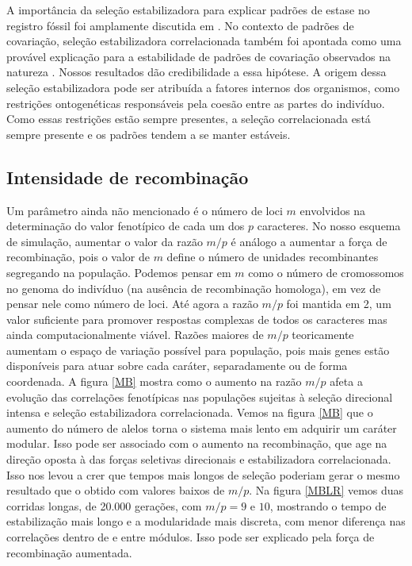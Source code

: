 A importância da seleção estabilizadora para explicar padrões de estase
no registro fóssil foi amplamente discutida em \cite{Charlesworth1982a}.
No contexto de padrões de covariação, seleção estabilizadora
correlacionada também foi apontada como uma provável explicação para a
estabilidade de padrões de covariação observados na natureza
\citep{Cheverud1984, Marroig2001, Porto2009}.
Nossos resultados dão credibilidade a essa hipótese.
A origem dessa seleção estabilizadora pode ser atribuída a fatores
internos dos organismos, como restrições ontogenéticas responsáveis pela
coesão entre as partes do indivíduo.
Como essas restrições estão sempre presentes, a seleção correlacionada
está sempre presente e os padrões tendem a se manter estáveis.

\subsection{Intensidade de recombinação}

Um parâmetro ainda não mencionado é o número de loci $m$ envolvidos na
determinação do valor fenotípico de cada um dos $p$ caracteres.
No nosso esquema de simulação, aumentar o valor da razão $m/p$ é análogo
a aumentar a força de recombinação, pois o valor de $m$ define o número
de unidades recombinantes segregando na população.
Podemos pensar em $m$ como o número de cromossomos no genoma do
indivíduo (na ausência de recombinação homologa), em vez de pensar nele
como número de loci. Até agora a razão $m/p$ foi
mantida em 2, um valor suficiente para promover respostas complexas de
todos os caracteres mas ainda computacionalmente viável.
Razões maiores de $m/p$ teoricamente aumentam o espaço de variação
possível para população, pois mais genes estão disponíveis para atuar
sobre cada caráter, separadamente ou de forma coordenada.
A figura \ref{MB} mostra como o aumento na razão $m/p$ afeta a evolução
das correlações fenotípicas nas populações sujeitas à seleção direcional
intensa e seleção estabilizadora correlacionada.
Vemos na figura \ref{MB} que o aumento do número de alelos torna o
sistema mais lento em adquirir um caráter modular.
Isso pode ser associado com o aumento na recombinação, que age na
direção oposta à das forças seletivas direcionais e estabilizadora
correlacionada.
Isso nos levou a crer que tempos mais longos de seleção poderiam gerar o
mesmo resultado que o obtido com valores baixos de $m/p$.
Na figura \ref{MBLR} vemos duas corridas longas, de 20.000 gerações, com
$m/p = 9$ e $10$, mostrando o tempo de estabilização mais longo e a
modularidade mais discreta, com menor diferença nas correlações dentro
de e entre módulos.
Isso pode ser explicado pela força de recombinação aumentada.

